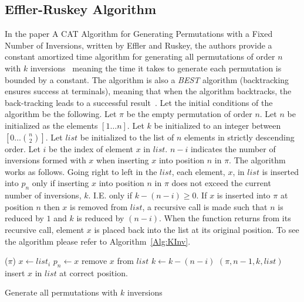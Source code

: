 \subsection{Effler-Ruskey Algorithm}
In the paper A CAT Algorithm for Generating Permutations with a Fixed Number of Inversions, written by Effler and Ruskey, the authors provide a 
constant amortized time algorithm for generating all permutations of order $n$ with $k$ inversions~\cite{A26} meaning 
the time it takes to generate each permutation is bounded by a constant.
The algorithm is also a \emph{BEST} algorithm (backtracking ensures success at terminals), meaning that when the algorithm backtracks, 
the back-tracking leads to a successful result~\cite{A26}. 
Let the initial conditions of the algorithm be the following. Let $\pi$ be the empty permutation of order $n$. Let $n$
be initialized as the elements $[1 \dots n]$. Let $k$ be initialized to an integer between $[0 \dots {n \choose 2}]$. 
Let $list$ be initialized to the list of $n$ elements in strictly descending order. 
Let $i$ be the index of element $x$ in $list$. $n-i$ 
indicates the number of inversions formed with $x$ when inserting $x$ into position $n$ in $\pi$.
The algorithm works as follows.
Going right to left in the $list$, each element, $x$, in $list$ is inserted into $p_{n}$
only if inserting $x$ into position $n$ in $\pi$ does not exceed the current number of inversions, $k$. I.E. only 
if $k- (n-i) \geq 0$.
If $x$ is inserted into $\pi$ at position $n$ then $x$ is removed from $list$, a recursive call is made such that $n$ is reduced by 
$1$ and $k$ is reduced by $(n-i)$. When the function returns from its recursive call, element $x$ is placed back into the list 
at its original position. To see the algorithm please refer to Algorithm~\ref{Alg:KInv}.\pagebreak
\begin{algorithm}[t]
    \begin{algorithmic}[1]
                ($\pi$)
            \Else
                    \State $x \gets list_{i}$
                        \State $p_{n} \gets x$
                        \State remove $x$ from $list$ 
                        \State $k \gets k - (n-i)$
                        $(\pi, n-1, k, list)$
                        \State insert $x$ in $list$ at correct position.
                    \EndIf
                \EndFor
            \EndIf
        \EndFunction
        
    \end{algorithmic}
    \caption{Generate all permutations with $k$ inversions}
    \label{Alg:KInv}
\end{algorithm} 

